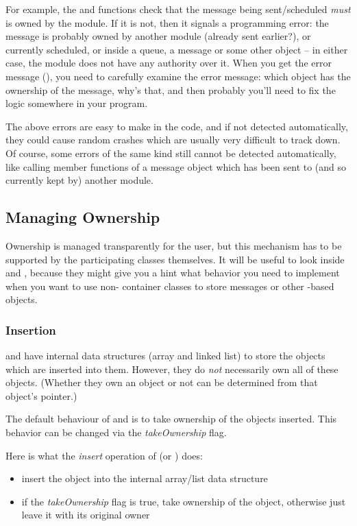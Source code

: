 For example, the  and  functions check
that the message being sent/scheduled \textit{must} is owned by the module.
If it is not, then it signals a programming error: the message is probably
owned by another module (already sent earlier?), or currently scheduled, or
inside a queue, a message or some other object -- in either case, the
module does not have any authority over it. When you get the error message
(), you need to carefully examine the error
message: which object has the ownership of the message, why's that, and
then probably you'll need to fix the logic somewhere in your program.

The above errors are easy to make in the code, and if not detected
automatically, they could cause random crashes which are usually very
difficult to track down. Of course, some errors of the same kind still
cannot be detected automatically, like calling member functions of a
message object which has been sent to (and so currently kept by) another
module.


\subsection{Managing Ownership}

Ownership is managed transparently for the user, but this mechanism
has to be supported by the participating classes themselves.
It will be useful to look inside  and ,
because they might give you a hint what behavior you need
to implement when you want to use non-{\opp} container classes
to store messages or other -based objects.


\subsubsection{Insertion}

 and  have internal data structures
(array and linked list) to store the objects which are inserted
into them. However, they do \textit{not} necessarily own all of these
objects.  (Whether they own an object or not can be determined
from that object's  pointer.)

The default behaviour of  and  is
to take ownership of the objects inserted.
This behavior can be changed via the \textit{takeOwnership} flag.

Here is what the \textit{insert} operation of  (or ) does:
\begin{itemize}
    \item{insert the object into the internal array/list data structure}

    \item{if the \textit{takeOwnership} flag is true, take ownership
    of the object, otherwise just leave it with its original owner}
\end{itemize}

